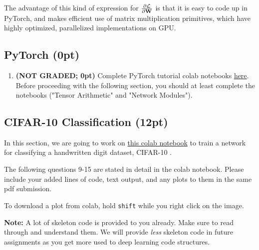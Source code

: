 \documentclass[12pt,letterpaper]{article}
\begin{document}
\begin{enumerate}[resume]
\begin{enumerate}
    \end{enumerate}

    
    The advantage of this kind of expression for $\frac{\partial \mathcal{L}}{\partial {\mathbf{W}}}$ is that it is easy to code up in PyTorch, and makes efficient use of matrix multiplication primitives, which have highly optimized, parallelized implementations on GPU.
\end{enumerate}

\vspace{-0.2in}
\subsection*{PyTorch (0pt)}

\begin{enumerate}[resume]
    \item \textbf{(NOT GRADED; 0pt)} Complete PyTorch tutorial colab notebooks \href{https://github.com/davidbau/how-to-read-pytorch}{here}. Before proceeding with the following section, you should at least complete the notebooks ("Tensor Arithmetic" and "Network Modules"). 
\end{enumerate}

\vspace{-0.2in}
\subsection*{CIFAR-10 Classification (12pt)}

In this section, we are going to work on \href{https://colab.research.google.com/drive/1H_Htddamebxg7trHfaO9uGiG_IuCi2b9?usp=sharing}{this colab notebook} to train a network for classifying a handwritten digit dataset, CIFAR-10 \citep{krizhevsky2009learning,torralba200880}. 


The following questions 9-15 are stated in detail in the colab notebook. Please include your added lines of code, text output, and any plots to them in the same pdf submission.

To download a plot from colab, hold \texttt{shift} while you right click on the image.

\textbf{Note:} A lot of skeleton code is provided to you already. Make sure to read through and understand them. We will provide \textit{less} skeleton code in future assignments as you get more used to deep learning code structures.
\end{document}
